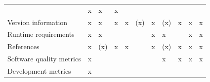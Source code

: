 \documentclass{article}
\begin{document}
\begin{figure}
\begin{tabular}{lllllllllll}
& x

& x

& x

& 

\\
Version information

& x

& x

& x

& x

& (x)

& x

& (x)

& x

& x

& x

\\
Runtime requirements

& x

& x

& 

& 

& 

& x

& x

& 

& x

& x

\\
References

& x

& (x)

& x

& x

& 

& x

& (x)

& x

& x

& x

\\
Software quality metrics

& x

& 

& 

& 

& 

& 

& x

& x

& x

& x

\\
Development metrics

& x

& 

& 


\end{tabular}
\end{figure}
\end{document}
